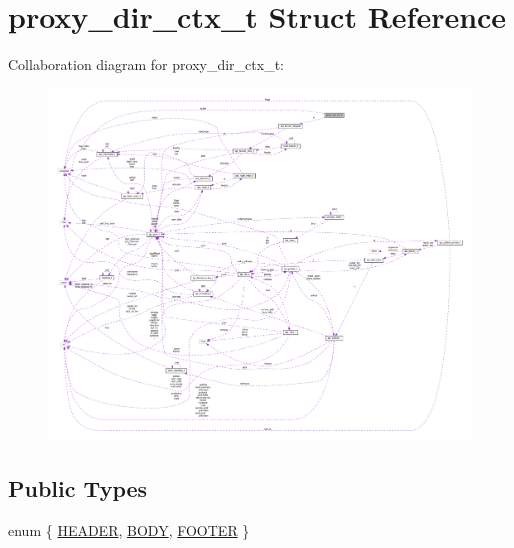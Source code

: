 \hypertarget{structproxy__dir__ctx__t}{}\section{proxy\+\_\+dir\+\_\+ctx\+\_\+t Struct Reference}
\label{structproxy__dir__ctx__t}


Collaboration diagram for proxy\+\_\+dir\+\_\+ctx\+\_\+t\+:
\nopagebreak
\begin{figure}[H]
\begin{center}
\leavevmode
\includegraphics[width=350pt]{structproxy__dir__ctx__t__coll__graph}
\end{center}
\end{figure}
\subsection*{Public Types}
\begin{DoxyCompactItemize}
\item 
enum \{ \hyperlink{structproxy__dir__ctx__t_aa2926737f6993b3002d021e881b105d5a8c44afff6acf5e1e091f628b5811998d}{H\+E\+A\+D\+ER}, 
\hyperlink{structproxy__dir__ctx__t_aa2926737f6993b3002d021e881b105d5aa58184ef41f4e03de3b4e8f26ca2d51a}{B\+O\+DY}, 
\hyperlink{structproxy__dir__ctx__t_aa2926737f6993b3002d021e881b105d5a9f18bcb4ea8f1ddc933808b9024dacd3}{F\+O\+O\+T\+ER}
 \}
\end{DoxyCompactItemize}
